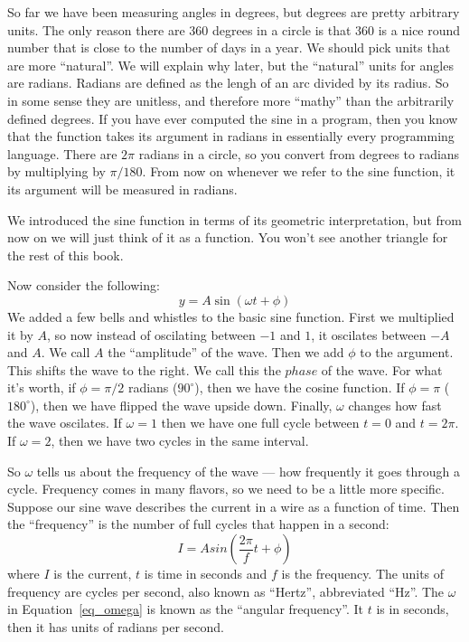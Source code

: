 So far we have been measuring angles in degrees, but degrees are pretty
arbitrary units. The only reason there are 360 degrees in a circle is
that 360 is a nice round number that is close to the number of days in
a year. We should pick units that are more ``natural''. We will explain
why later, but the ``natural'' units for angles are radians. Radians are defined as the lengh of an arc divided by its radius. So in some sense they
are unitless, and therefore more ``mathy'' than the arbitrarily defined
degrees. If you have ever computed the sine in a program, then you know
that the  function takes its argument in radians in essentially
every programming language. There are $2\pi$ radians in a circle, so you
convert from degrees to radians by multiplying by $\pi/180$.
From now on whenever we refer to the sine function, it its argument
will be measured in radians.

We introduced the sine function in terms of its geometric interpretation,
but from now on we will just think of it as a function. You won't see
another triangle for the rest of this book.

Now consider the following:
\begin{equation}
y = A\sin(\omega t + \phi)
\label{eq_omega}
\end{equation}
We added a few bells and whistles to the basic sine function. First we
multiplied it by $A$, so now instead of oscilating between $-1$ and $1$,
it oscilates between $-A$ and $A$. We call $A$ the ``amplitude'' of the
wave. Then we add $\phi$ to the argument. This shifts the wave to the right.
We call this the $phase$ of the wave. For what it's worth, if $\phi = \pi/2$
radians ($90^\circ$), then we have the cosine function. If $\phi = \pi$
($180^\circ$), then we have flipped the wave upside down. Finally, 
$\omega$ changes how fast the wave oscilates. If $\omega=1$ then we have one full cycle between $t=0$ and $t=2\pi$. If $\omega=2$, then we have
two cycles in the same interval.

So $\omega$ tells us about the frequency of the wave --- \ie how frequently
it goes through a cycle. Frequency comes in many flavors, so we need to 
be a little more specific. Suppose our sine wave describes the current in
a wire as a function of time. Then the ``frequency'' is the number of 
full cycles that happen in a second:
\begin{equation}
I = A sin(\frac{2\pi}{f} t + \phi)
\end{equation}
where $I$ is the current,
$t$ is time in seconds and $f$ is the frequency. 
The units of frequency are cycles per second, also known as ``Hertz'',
abbreviated ``Hz''.
The $\omega$ in Equation~\ref{eq_omega} is known as the ``angular frequency''.
It $t$ is in seconds, then it has units of radians per second.

